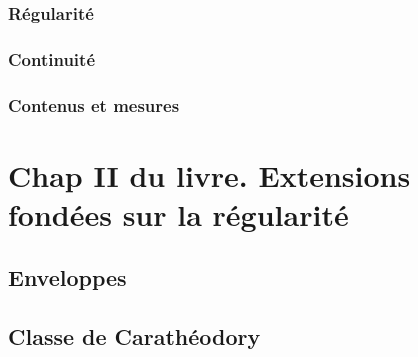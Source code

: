 \subsubsection{Régularité} \label{Regularite}
\subsubsection{Continuité} \label{Continuite}
\subsubsection{Contenus et mesures} \label{ContenusMesures}

\section{Chap II du livre. Extensions fondées sur la régularité}\label{ExtenRegul}
\subsection{Enveloppes}\label{Enveloppes}
\subsection{Classe de Carathéodory} \label{ClasseCaratheodory}


